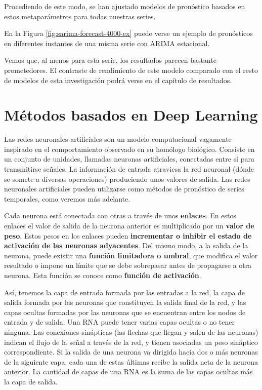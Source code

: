 \documentclass[]{book}
\begin{document}
Procediendo de este modo, se han ajustado modelos de pronóstico basados
en estos metaparámetros para todas nuestras series.

En la Figura \ref{fig:sarima-forecast-4000-ex} puede verse un ejemplo de
pronósticos en diferentes instantes de una misma serie con ARIMA
estacional.

Vemos que, al menos para esta serie, los resultados parecen bastante
prometedores. El contraste de rendimiento de este modelo comparado con
el resto de modelos de esta investigación podrá verse en el capítulo de
resultados.

\chapter{Métodos basados en Deep
Learning}\label{metodos-basados-en-deep-learning}

Las redes neuronales artificiales son un modelo computacional vagamente
inspirado en el comportamiento observado en su homólogo biológico.
Consiste en un conjunto de unidades, llamadas neuronas artificiales,
conectadas entre sí para transmitirse señales. La información de entrada
atraviesa la red neuronal (dónde se somete a diversas operaciones)
produciendo unos valores de salida. Las redes neuronales artificiales
pueden utilizarse como métodos de pronóstico de series temporales, como
veremos más adelante.

Cada neurona está conectada con otras a través de unos \textbf{enlaces}.
En estos enlaces el valor de salida de la neurona anterior es
multiplicado por un \textbf{valor de peso}. Estos pesos en los enlaces
pueden \textbf{incrementar o inhibir el estado de activación de las
neuronas adyacentes}. Del mismo modo, a la salida de la neurona, puede
existir una \textbf{función limitadora o umbral}, que modifica el valor
resultado o impone un límite que se debe sobrepasar antes de propagarse
a otra neurona. Esta función se conoce como \textbf{función de
activación}.

Así, tenemos la capa de entrada formada por las entradas a la red, la
capa de salida formada por las neuronas que constituyen la salida final
de la red, y las capas ocultas formadas por las neuronas que se
encuentran entre los nodos de entrada y de salida. Una RNA puede tener
varias capas ocultas o no tener ninguna. Las conexiones sinápticas (las
flechas que llegan y salen de las neuronas) indican el flujo de la señal
a través de la red, y tienen asociadas un peso sináptico
correspondiente. Si la salida de una neurona va dirigida hacia dos o más
neuronas de la siguiente capa, cada una de estas últimas recibe la
salida neta de la neurona anterior. La cantidad de capas de una RNA es
la suma de las capas ocultas más la capa de salida.
\end{document}
